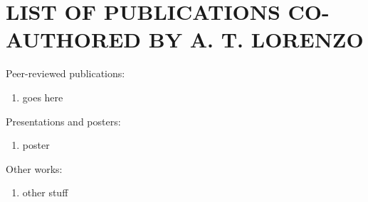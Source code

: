 \chapter{LIST OF PUBLICATIONS CO-AUTHORED BY A. T. LORENZO}
Peer-reviewed publications:
\begin{enumerate}

\item goes here

\end{enumerate}



\noindent Presentations and posters:

\begin{enumerate}

\item poster


\end{enumerate}


\noindent Other works:

\begin{enumerate}

\item other stuff

\end{enumerate}
